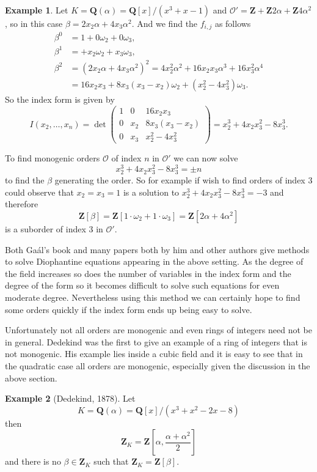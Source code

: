\documentclass[12pt,a4paper,abstracton,bibtotoc]{scrreprt}
\theoremstyle{definition}
\newtheorem{ex}{Example}
\newcommand{\QQ}{\mathbf{Q}}
\newcommand{\ZZ}{\mathbf{Z}}
\renewcommand{\O}{\mathcal{O}}
\begin{document}
\begin{ex}
Let $K = \QQ(\alpha) = \QQ[x]/(x^3 + x - 1)$ and $\O' = \ZZ + \ZZ2\alpha + \ZZ4\alpha^2$, so in this case $\beta = 2x_2\alpha + 4x_3\alpha^2$.
And we find the $f_{i,j}$ as follows
\begin{align*}
\beta^0 &= 1 + 0\omega_2 + 0\omega_3,\\
\beta^1 &=  + x_2\omega_2 + x_3\omega_3,\\
\beta^2 &= (2x_2\alpha + 4x_3\alpha^2)^2 = 4x_2^2\alpha^2 + 16x_2x_3\alpha^3 + 16x_3^2\alpha^4 \\
&= 16x_2x_3 + 8x_3(x_3-x_2)\omega_2 + (x_2^2 - 4x_3^2)\omega_3.
\end{align*}
So the index form is given by
\[
I(x_2,\ldots,x_n) = \det\begin{pmatrix}
1 & 0   &  16x_2x_3\\
0 & x_2 & 8x_3(x_3-x_2)\\
0 & x_3 & x_2^2 -4x_3^2
\end{pmatrix}
= x_2^3 + 4x_2x_3^2 - 8x_3^3.
\]

To find monogenic orders $\O$ of index $n$ in $\O'$ we can now solve 
\[x_2^3 + 4x_2x_3^2 - 8x_3^3 = \pm n\]
to find the $\beta$ generating the order.
So for example if wish to find orders of index 3 could observe that $x_2 = x_3 = 1$ is a solution to $x_2^3 + 4x_2x_3^2 - 8x_3^3 = -3$ and therefore
\[
\ZZ[\beta] = \ZZ[1\cdot\omega_2 + 1\cdot \omega_3] = \ZZ[2\alpha + 4\alpha^2]
\]
is a suborder of index 3 in $\O'$.
\end{ex}

Both Ga\'al's book and many papers both by him and other authors give methods to solve Diophantine equations appearing in the above setting.
As the degree of the field increases so does the number of variables in the index form and the degree of the form so it becomes difficult to solve such equations for even moderate degree.
Nevertheless using this method we can certainly hope to find some orders quickly if the index form ends up being easy to solve.

Unfortunately not all orders are monogenic and even rings of integers need not be in general.
Dedekind was the first to give an example of a ring of integers that is not monogenic.
His example lies inside a cubic field and it is easy to see that in the quadratic case all orders are monogenic, especially given the discussion in the above section.

\begin{ex}[Dedekind, 1878]
Let 
\[
K = \QQ(\alpha) = \QQ[x]/(x^3 +x^2 -2x-8)
\]
then
\[
\ZZ_K=\ZZ\left[ \alpha,\frac{\alpha + \alpha^2}{2}\right]
\]
and there is no $\beta\in \ZZ_K$ such that $\ZZ_K=\ZZ[\beta]$.
\end{ex}
\end{document}
